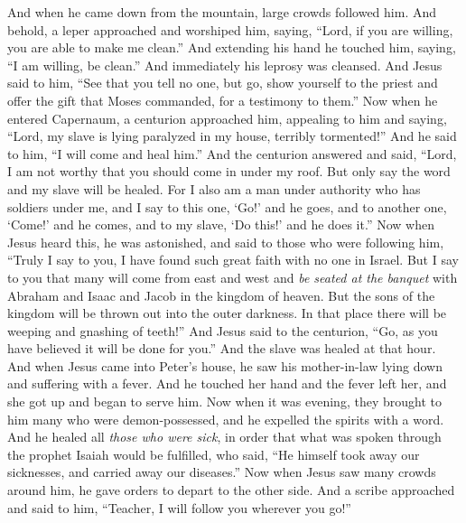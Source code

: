 \begin{biblechapter} %
 And when he came down from the mountain, large crowds followed him.
\verse And behold, a leper approached and worshiped him, saying, “Lord, if you are willing, you are able to make me clean.”
\verse And extending his hand he touched him, saying, “I am willing, be clean.” And immediately his leprosy was cleansed.
\verse And Jesus said to him, “See that you tell no one, but go, show yourself to the priest and offer the gift that Moses commanded, for a testimony to them.”
 Now when he entered Capernaum, a centurion approached him, appealing to him
\verse and saying, “Lord, my slave is lying paralyzed in my house, terribly tormented!”
\verse And he said to him, “I will come and heal him.”
\verse And the centurion answered and said, “Lord, I am not worthy that you should come in under my roof. But only say the word and my slave will be healed.
\verse For I also am a man under authority who has soldiers under me, and I say to this one, ‘Go!’ and he goes, and to another one, ‘Come!’ and he comes, and to my slave, ‘Do this!’ and he does it.”
\verse Now when Jesus heard this, he was astonished, and said to those who were following him, “Truly I say to you, I have found such great faith with no one in Israel.
\verse But I say to you that many will come from east and west and \textit{be seated at the banquet} with Abraham and Isaac and Jacob in the kingdom of heaven.
\verse But the sons of the kingdom will be thrown out into the outer darkness. In that place there will be weeping and gnashing of teeth!”
\verse And Jesus said to the centurion, “Go, as you have believed it will be done for you.” And the slave was healed at that hour.
 And when Jesus came into Peter’s house, he saw his mother-in-law lying down and suffering with a fever.
\verse And he touched her hand and the fever left her, and she got up and began to serve him.
\verse Now when it was evening, they brought to him many who were demon-possessed, and he expelled the spirits with a word. And he healed all \textit{those who were sick},
\verse in order that what was spoken through the prophet Isaiah would be fulfilled, who said, “He himself took away our sicknesses, 
and carried away our diseases.”
 Now when Jesus saw many crowds around him, he gave orders to depart to the other side.
\verse And a scribe approached and said to him, “Teacher, I will follow you wherever you go!”

\end{biblechapter}
